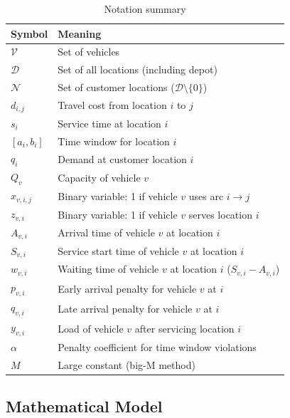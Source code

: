 \begin{table}[ht]
	\renewcommand{\arraystretch}{1.3}
	\caption{Notation summary}
	\label{tab:notation}
	\centering
	\begin{tabular}{l|l}
		\hline\hline
		Symbol & Meaning  \\
		\hline \hline
		$\mathcal{V}$ & Set of vehicles \\ 
        \hline
        $\mathcal{D}$ & Set of all locations (including depot) \\
        \hline
        $\mathcal{N}$ & Set of customer locations ($\mathcal{D}\setminus\{0\}$) \\
        \hline
        $d_{i,j}$ & Travel cost from location $i$ to $j$ \\
        \hline
        $s_i$ & Service time at location $i$ \\
		\hline
        $[a_i,b_i]$ & Time window for location $i$\\
        \hline
        $q_i$ & Demand at customer location $i$\\
        \hline
        $Q_v$ & Capacity of vehicle $v$ \\
        \hline
        $x_{v,i,j}$ & Binary variable: 1 if vehicle $v$ uses arc $i\rightarrow j$ \\
        \hline
        $z_{v,i}$ & Binary variable: 1 if vehicle $v$ serves location $i$\\
        \hline
        $A_{v,i}$ & Arrival time of vehicle $v$ at location $i$\\
        \hline
        $S_{v,i}$ & Service start time of vehicle $v$ at location $i$\\
        \hline
        $w_{v,i}$ & Waiting time of vehicle $v$ at location $i$ ($S_{v,i}-A_{v,i}$)\\
        \hline
        $p_{v,i}$ & Early arrival penalty for vehicle $v$ at $i$ \\ 
        \hline
        $q_{v,i}$ & Late arrival penalty for vehicle $v$ at $i$ \\ 
        \hline
        $y_{v,i}$ & Load of vehicle $v$ after servicing location $i$\\
        \hline
        $\alpha$ & Penalty coefficient for time window violations\\
        \hline
        $M$ & Large constant (big-M method)\\
        \hline \hline
	\end{tabular}
\end{table}

\subsection{Mathematical Model}

